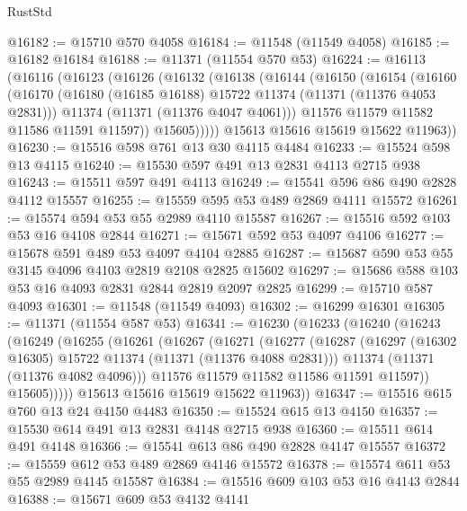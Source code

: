 \begin{lexlean}{RustStd}
\begin{coremodule}
@16182 := @15710 @570 @4058
@16184 := @11548 (@11549 @4058)
@16185 := @16182 @16184
@16188 := @11371 (@11554 @570 @53)
@16224 := @16113
    (@16116
      (@16123
        (@16126
          (@16132
            (@16138
              (@16144
                (@16150
                  (@16154
                    (@16160
                      (@16170
                        (@16180 (@16185 @16188) @15722 @11374 (@11371 (@11376 @4053 @2831)))
                        @11374
                        (@11371 (@11376 @4047 @4061)))
                      @11576
                      @11579
                      @11582
                      @11586
                      @11591
                      @11597))
                  @15605)))))
        @15613
        @15616
        @15619
        @15622
        @11963))
@16230 := @15516 @598 @761 @13 @30 @4115 @4484
@16233 := @15524 @598 @13 @4115
@16240 := @15530 @597 @491 @13 @2831 @4113 @2715 @938
@16243 := @15511 @597 @491 @4113
@16249 := @15541 @596 @86 @490 @2828 @4112 @15557
@16255 := @15559 @595 @53 @489 @2869 @4111 @15572
@16261 := @15574 @594 @53 @55 @2989 @4110 @15587
@16267 := @15516 @592 @103 @53 @16 @4108 @2844
@16271 := @15671 @592 @53 @4097 @4106
@16277 := @15678 @591 @489 @53 @4097 @4104 @2885
@16287 := @15687 @590 @53 @55 @3145 @4096 @4103 @2819 @2108 @2825 @15602
@16297 := @15686 @588 @103 @53 @16 @4093 @2831 @2844 @2819 @2097 @2825
@16299 := @15710 @587 @4093
@16301 := @11548 (@11549 @4093)
@16302 := @16299 @16301
@16305 := @11371 (@11554 @587 @53)
@16341 := @16230
    (@16233
      (@16240
        (@16243
          (@16249
            (@16255
              (@16261
                (@16267
                  (@16271
                    (@16277
                      (@16287
                        (@16297 (@16302 @16305) @15722 @11374 (@11371 (@11376 @4088 @2831)))
                        @11374
                        (@11371 (@11376 @4082 @4096)))
                      @11576
                      @11579
                      @11582
                      @11586
                      @11591
                      @11597))
                  @15605)))))
        @15613
        @15616
        @15619
        @15622
        @11963))
@16347 := @15516 @615 @760 @13 @24 @4150 @4483
@16350 := @15524 @615 @13 @4150
@16357 := @15530 @614 @491 @13 @2831 @4148 @2715 @938
@16360 := @15511 @614 @491 @4148
@16366 := @15541 @613 @86 @490 @2828 @4147 @15557
@16372 := @15559 @612 @53 @489 @2869 @4146 @15572
@16378 := @15574 @611 @53 @55 @2989 @4145 @15587
@16384 := @15516 @609 @103 @53 @16 @4143 @2844
@16388 := @15671 @609 @53 @4132 @4141

\end{coremodule}
\end{lexlean}
